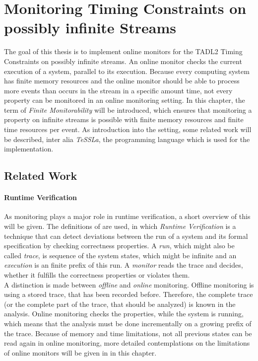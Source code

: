 
\chapter{Monitoring Timing Constraints on possibly infinite Streams}
\label{chapter-monitorability}
	The goal of this thesis is to implement online monitors for the TADL2 Timing Constraints on possibly infinite streams. An online monitor checks the current execution of a system, parallel to its execution. Because every computing system has finite memory resources and the online monitor should be able to process more events than occurs in the stream in a specific amount time, not every property can be monitored in an online monitoring setting. In this chapter, the term of \emph{Finite Monitorability} will be introduced, which ensures that monitoring a property on infinite streams is possible with finite memory resources and finite time resources per event. As introduction into the setting, some related work will be described, inter alia \emph{TeSSLa}, the programming language which is used for the implementation.

\section{Related Work}

	\subsubsection{Runtime Verification}
		As monitoring plays a major role in runtime verification, a short overview of this will be given. The definitions of \cite{RuntimeVerification} are used, in which \emph{Runtime Verification} is a technique that can detect deviations between the run of a system and its formal specification by checking correctness properties. A \emph{run}, which might also be called \emph{trace}, is sequence of the system states, which might be infinite and an \emph{execution} is an finite prefix of this run. A \emph{monitor} reads the trace and decides, whether it fulfills the correctness properties or violates them.\\
		A distinction is made between \emph{offline} and \emph{online} monitoring. Offline monitoring is using a stored trace, that has been recorded before. Therefore, the complete trace (or the complete part of the trace, that should be analyzed) is known in the analysis. Online monitoring checks the properties, while the system is running, which means that the analysis must be done incrementally on a growing prefix of the trace. Because of memory and time limitations, not all previous states can be read again in online monitoring, more detailed contemplations on the limitations of online monitors will be given in in this chapter.

